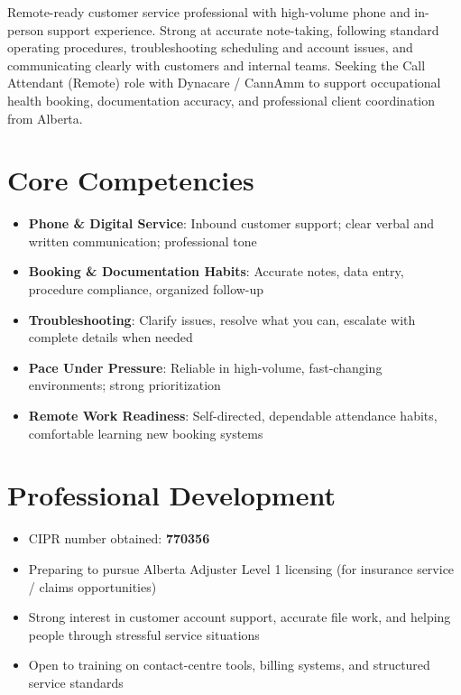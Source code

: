 \documentclass[11pt,a4paper,sans]{moderncv}
\begin{document}
\makecvtitle

\vspace{6pt}
\small{Remote-ready customer service professional with high-volume phone and in-person support experience. Strong at accurate note-taking, following standard operating procedures, troubleshooting scheduling and account issues, and communicating clearly with customers and internal teams. Seeking the Call Attendant (Remote) role with Dynacare / CannAmm to support occupational health booking, documentation accuracy, and professional client coordination from Alberta.}

\section{Core Competencies}
\vspace{1pt}
\begin{itemize}
\item \textbf{Phone \& Digital Service}: Inbound customer support; clear verbal and written communication; professional tone
\item \textbf{Booking \& Documentation Habits}: Accurate notes, data entry, procedure compliance, organized follow-up
\item \textbf{Troubleshooting}: Clarify issues, resolve what you can, escalate with complete details when needed
\item \textbf{Pace Under Pressure}: Reliable in high-volume, fast-changing environments; strong prioritization
\item \textbf{Remote Work Readiness}: Self-directed, dependable attendance habits, comfortable learning new booking systems
\end{itemize}

\section{Professional Development}
\vspace{1pt}
\begin{itemize}
\item CIPR number obtained: \textbf{770356}
\item Preparing to pursue Alberta Adjuster Level 1 licensing (for insurance service / claims opportunities)
\item Strong interest in customer account support, accurate file work, and helping people through stressful service situations
\item Open to training on contact-centre tools, billing systems, and structured service standards
\end{itemize}
\end{document}

